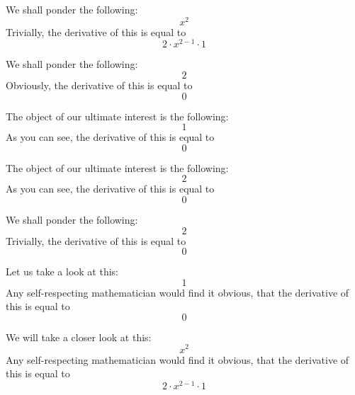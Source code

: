 \documentclass{article}
\begin{document}
We shall ponder the following:
\begin{equation}
x ^{2 } 
\end{equation}
Trivially, the derivative of this is equal to
\begin{equation}
2 \cdot x ^{2 - 1 } \cdot 1 
\end{equation}

We shall ponder the following:
\begin{equation}
2 
\end{equation}
Obviously, the derivative of this is equal to
\begin{equation}
0 
\end{equation}

The object of our ultimate interest is the following:
\begin{equation}
1 
\end{equation}
As you can see, the derivative of this is equal to
\begin{equation}
0 
\end{equation}

The object of our ultimate interest is the following:
\begin{equation}
2 
\end{equation}
As you can see, the derivative of this is equal to
\begin{equation}
0 
\end{equation}

We shall ponder the following:
\begin{equation}
2 
\end{equation}
Trivially, the derivative of this is equal to
\begin{equation}
0 
\end{equation}

Let us take a look at this:
\begin{equation}
1 
\end{equation}
Any self-respecting mathematician would find it obvious, that the derivative of this is equal to
\begin{equation}
0 
\end{equation}

We will take a closer look at this:
\begin{equation}
x ^{2 } 
\end{equation}
Any self-respecting mathematician would find it obvious, that the derivative of this is equal to
\begin{equation}
2 \cdot x ^{2 - 1 } \cdot 1 
\end{equation}
\end{document}
